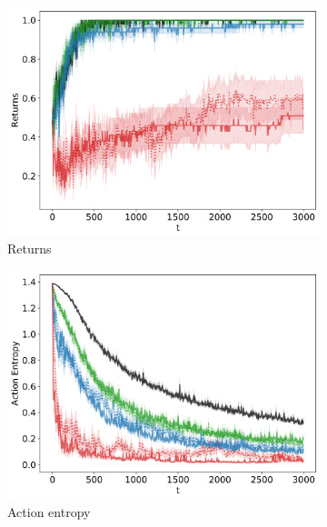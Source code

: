 \begin{figure}[!ht]
\centering
  \begin{subfigure}[b]{0.32\linewidth}
    \includegraphics[width=\textwidth]{articles/baselines/figs/baseline_4rooms/VPG_absolute_perturb_Returns.png}
    \caption{Returns}
  \end{subfigure}
    \begin{subfigure}[b]{0.32\linewidth}
    \includegraphics[width=\textwidth]{articles/baselines/figs/baseline_4rooms/VPG_absolute_perturb_Action_Entropy.png}
    \caption{Action entropy}
  \end{subfigure}
  \begin{subfigure}[b]{0.32\linewidth}

\end{subfigure}
\end{figure}
